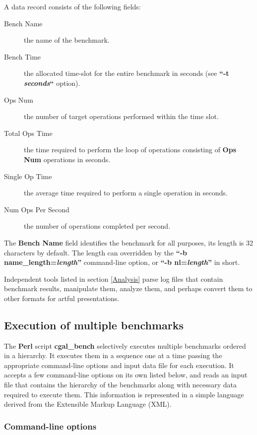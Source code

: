 A data record consists of the following fields:
\begin{description}
\item[Bench Name] the name of the benchmark.
\item[Bench Time] the allocated time-slot for the entire benchmark in
seconds (see \textbf{``-t {\em seconds}``} option).
\item[Ops Num] the number of target operations performed within the
time slot.
\item[Total Ops Time] the time required to perform the loop of
operations consisting of \textbf{Ops Num} operations in seconds.
\item[Single Op Time] the average time required to perform a single
operation in seconds.
\item[Num Ops Per Second] the number of operations completed per second.
\end{description}

The \textbf{Bench Name} field identifies the benchmark for all
purposes, its length is 32 characters by default. The length can
overridden by the \textbf{``-b name\_length={\em length}''}
command-line option, or \textbf{``-b nl={\em length}''} in short.

Independent tools listed in section \ref{Analysis} parse log files
that contain benchmark results, manipulate them, analyze them, and
perhaps convert them to other formats for artful presentations.

\subsection{Execution of multiple benchmarks}
The \textbf{Perl} script \textbf{cgal\_bench} selectively executes
multiple benchmarks ordered in a hierarchy. It executes them in a
sequence one at a time passing the appropriate command-line
options and input data file for each execution. It accepts a few
command-line options on its own listed below, and reads an input file
that contains the hierarchy of the benchmarks along with necessary
data required to execute them. This information is represented in a
simple language derived from the Extensible Markup Language (XML).

\subsubsection{Command-line options}

